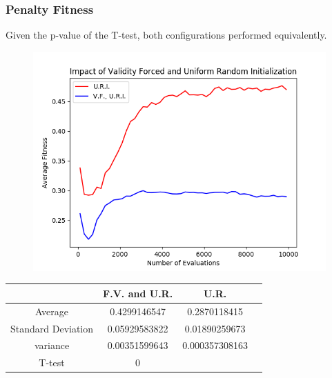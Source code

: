 \documentclass{article}
\begin{document}
		\subsubsection{Penalty Fitness}
			Given the p-value of the T-test, both configurations performed equivalently.
			\begin{figure}[!htb]
			\centering
			\includegraphics[scale=0.4]{q2_random_board_penalty_ur_vs_vfur.png}
			\end{figure}
			\begin{center}
			\begin{tabular}{ || c | c | c | c ||}
			\hline
			       & F.V. and U.R. & U.R.\\ 
			 \hline\hline
			 Average & 0.4299146547	& 0.2870118415 \\ 
			 \hline
			 Standard Deviation &	0.05929583822 &	0.01890259673\\
			 \hline
			 variance &	0.00351599643 &	0.000357308163 \\
			 \hline
			 T-test &	0	& \\
			 \hline
			\end{tabular}
			\end{center}
	
	
\end{document}
